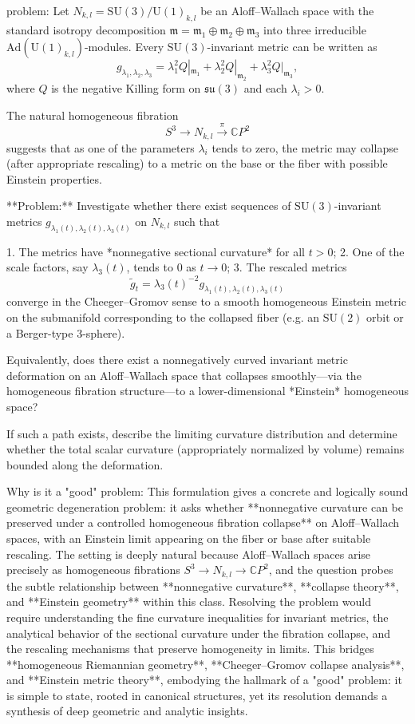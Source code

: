 problem:  
Let \( N_{k,l} = \mathrm{SU}(3)/\mathrm{U}(1)_{k,l} \) be an Aloff–Wallach space with the standard isotropy decomposition \( \mathfrak{m} = \mathfrak{m}_1 \oplus \mathfrak{m}_2 \oplus \mathfrak{m}_3 \) into three irreducible \(\mathrm{Ad}(\mathrm{U}(1)_{k,l})\)-modules. Every \(\mathrm{SU}(3)\)-invariant metric can be written as  
\[
g_{\lambda_1, \lambda_2, \lambda_3} = \lambda_1^2 Q|_{\mathfrak{m}_1} + \lambda_2^2 Q|_{\mathfrak{m}_2} + \lambda_3^2 Q|_{\mathfrak{m}_3},
\]
where \(Q\) is the negative Killing form on \(\mathfrak{su}(3)\) and each \(\lambda_i > 0\).  

The natural homogeneous fibration  
\[
S^3 \longrightarrow N_{k,l} \xrightarrow{\pi} \mathbb{C}P^2
\]
suggests that as one of the parameters \(\lambda_i\) tends to zero, the metric may collapse (after appropriate rescaling) to a metric on the base or the fiber with possible Einstein properties.  

**Problem:**  
Investigate whether there exist sequences of \(\mathrm{SU}(3)\)-invariant metrics \(g_{\lambda_1(t), \lambda_2(t), \lambda_3(t)}\) on \(N_{k,l}\) such that  

1. The metrics have *nonnegative sectional curvature* for all \(t > 0\);  
2. One of the scale factors, say \(\lambda_3(t)\), tends to \(0\) as \(t \to 0\);  
3. The rescaled metrics  
   \[
   \tilde g_t = \lambda_3(t)^{-2} g_{\lambda_1(t), \lambda_2(t), \lambda_3(t)}
   \]
   converge in the Cheeger–Gromov sense to a smooth homogeneous Einstein metric on the submanifold corresponding to the collapsed fiber (e.g. an \(\mathrm{SU}(2)\) orbit or a Berger-type 3-sphere).

Equivalently, does there exist a nonnegatively curved invariant metric deformation on an Aloff–Wallach space that collapses smoothly—via the homogeneous fibration structure—to a lower-dimensional *Einstein* homogeneous space?  

If such a path exists, describe the limiting curvature distribution and determine whether the total scalar curvature (appropriately normalized by volume) remains bounded along the deformation.

Why is it a "good" problem:  
This formulation gives a concrete and logically sound geometric degeneration problem: it asks whether **nonnegative curvature can be preserved under a controlled homogeneous fibration collapse** on Aloff–Wallach spaces, with an Einstein limit appearing on the fiber or base after suitable rescaling. The setting is deeply natural because Aloff–Wallach spaces arise precisely as homogeneous fibrations \(S^3 \to N_{k,l} \to \mathbb{C}P^2\), and the question probes the subtle relationship between **nonnegative curvature**, **collapse theory**, and **Einstein geometry** within this class.  
Resolving the problem would require understanding the fine curvature inequalities for invariant metrics, the analytical behavior of the sectional curvature under the fibration collapse, and the rescaling mechanisms that preserve homogeneity in limits. This bridges **homogeneous Riemannian geometry**, **Cheeger–Gromov collapse analysis**, and **Einstein metric theory**, embodying the hallmark of a "good" problem: it is simple to state, rooted in canonical structures, yet its resolution demands a synthesis of deep geometric and analytic insights.